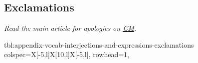 \documentclass[../nihongo-gakushuu-kyouzai-vocabulary.tex]{subfiles}
\begin{document}
\subsection{Exclamations}
\emph{Read the main article for apologies on \href{https://www.clozemaster.com/blog/sorry-in-japanese/}{CM}.}

{tbl:appendix-vocab-interjections-and-expressions-exclamations}  %
{}  %
{
    colspec={X[-5,l]X[10,l]X[-5,l]},
    rowhead=1,
}  %
\end{document}
